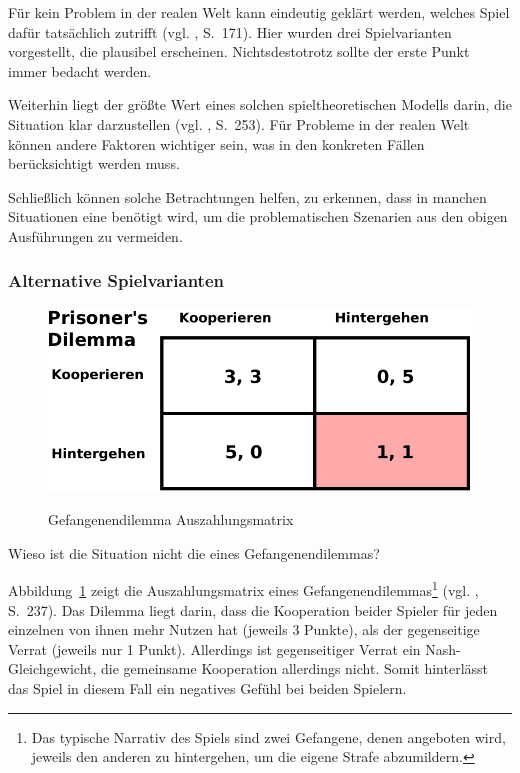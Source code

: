 Für kein Problem in der realen Welt kann eindeutig geklärt werden, welches Spiel dafür tatsächlich zutrifft
(vgl. \cite{Poundstone}, S.~171). Hier wurden drei Spielvarianten vorgestellt, die plausibel erscheinen. Nichtsdestotrotz sollte
der erste Punkt immer bedacht werden.

Weiterhin liegt der größte Wert eines solchen spieltheoretischen Modells darin, die Situation klar darzustellen
(vgl. \cite{Poundstone}, S.~253). Für Probleme in der realen Welt können andere Faktoren wichtiger sein, was in den
konkreten Fällen berücksichtigt werden muss.

Schließlich können solche Betrachtungen helfen, zu erkennen, dass in manchen Situationen eine \grqq{}
benötigt wird, um die problematischen Szenarien aus den obigen Ausführungen zu vermeiden.

\subsubsection{Alternative Spielvarianten}

\begin{figure}%
\centering
\caption{Gefangenendilemma Auszahlungsmatrix}
\includegraphics[scale=0.8]{Grafiken/Prisoner_Ink.pdf} 
\label{pic:Prisoner}
\end{figure}

Wieso ist die Situation nicht die eines Gefangenendilemmas?

Abbildung~\ref{pic:Prisoner} zeigt die Auszahlungsmatrix eines Gefangenendilemmas\footnote{
Das typische Narrativ des Spiels sind zwei Gefangene, denen angeboten wird, jeweils den anderen zu hintergehen,
um die eigene Strafe abzumildern.
} (vgl. \cite{Poundstone}, S.~237).
Das Dilemma liegt darin, dass die Kooperation beider Spieler für jeden einzelnen von ihnen mehr Nutzen hat (jeweils 3 Punkte),
als der gegenseitige Verrat (jeweils nur 1 Punkt). Allerdings ist gegenseitiger Verrat ein Nash-Gleichgewicht, die
gemeinsame Kooperation allerdings nicht. Somit hinterlässt das \grqq{} Spiel in diesem Fall ein negatives
Gefühl bei beiden Spielern.

